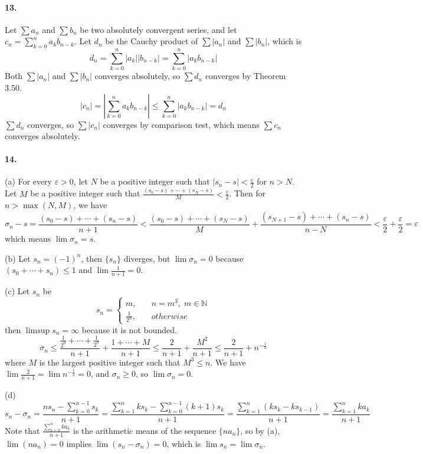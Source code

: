 \documentclass[a4paper]{article}
\begin{document}
\paragraph{13.}
Let $\sum a_n$ and $\sum  b_n$ be two absolutely convergent series, and let $c_n=\sum_{k=0}^n a_kb_{n-k}$. Let $d_n$ be the Cauchy product of $\sum|a_n|$ and $\sum|b_n|$, which is
\[
d_n=\sum_{k=0}^n|a_k||b_{n-k}|=\sum_{k=0}^n|a_k b_{n-k}|
\]
Both $\sum|a_n|$ and $\sum|b_n|$ converges absolutely, so $\sum d_n$ converges by Theorem 3.50.
\[
|c_n|=\left|\sum_{k=0}^n a_kb_{n-k} \right|\leq\sum_{k=0}^n|a_k b_{n-k}|=d_n
\]
$\sum d_n$ converges, so $\sum|c_n|$ converges by comparison test, which means $\sum c_n$ converges absolutely.

\paragraph{14.}

(a)
For every $\varepsilon>0$, let $N$ be a positive integer such that $|s_n-s|<\frac{\varepsilon}{2}$ for $n>N$. Let $M$ be a positive integer such that $\frac{(s_0-s)+\cdots+(s_N-s)}{M}<\frac{\varepsilon}{2}$. Then for $n>\max(N,M)$, we have
\[
\sigma_n-s=\frac{(s_0-s)+\cdots+(s_n-s)}{n+1}<\frac{(s_0-s)+\cdots+(s_N-s)}{M}+\frac{(s_{N+1}-s)+\cdots+(s_n-s)}{n-N}<\frac{\varepsilon}{2}+\frac{\varepsilon}{2}=\varepsilon
\]
which means $\lim\sigma_n=s$.
\medskip

(b)
Let $s_n=(-1)^n$, then $\{s_n\}$ diverges, but $\lim\sigma_n=0$ because $(s_0+\cdots+s_n)\leq1$ and $\lim\frac{1}{n+1}=0$.
\medskip

(c)
Let $s_n$ be 
\[
s_n=\begin{cases}
m,\quad & n=m^3,\;m\in\mathbb{N}\\
\frac{1}{2^n},\quad & otherwise
\end{cases}
\]
then $\limsup s_n=\infty$ because it is not bounded.
\[
\sigma_n\leq\frac{\frac{1}{2^0}+\cdots+\frac{1}{2^n}}{n+1}+\frac{1+\cdots+M}{n+1}\leq\frac{2}{n+1}+\frac{M^2}{n+1}\leq\frac{2}{n+1}+n^{-\frac{1}{3}}
\]
where $M$ is the largest positive integer such that $M^3\leq n$. We have $\lim\frac{2}{n+1}=\lim n^{-\frac{1}{3}}=0$, and $\sigma_n\geq0$, so $\lim\sigma_n=0$.
\medskip

(d)
\[
s_n-\sigma_n=\frac{ns_n-\sum_{k=0}^{n-1}s_k}{n+1}=\frac{\sum_{k=1}^n ks_k-\sum_{k=0}^{n-1}(k+1)s_k}{n+1}=\frac{\sum_{k=1}^n(ks_k-ks_{k-1})}{n+1}=\frac{\sum_{k=1}^n ka_k}{n+1}
\]
Note that $\frac{\sum_{k=0}^n ka_k}{n+1}$ is the arithmetic means of the sequence $\{na_n\}$, so by (a), $\lim(na_n)=0$ implies $\lim(s_n-\sigma_n)=0$, which is $\lim s_n=\lim\sigma_n$.
\medskip
\end{document}

